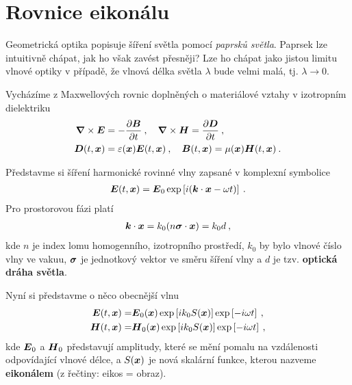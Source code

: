 \section{Rovnice eikonálu}

Geometrická optika popisuje šíření světla pomocí \textit{paprsků světla}. Paprsek lze intuitivně chápat, jak ho však zavést přesněji? Lze ho chápat jako jistou limitu vlnové optiky v případě, že vlnová délka světla $\lambda$ bude velmi malá, tj. $\lambda \rightarrow 0$.

Vycházíme z Maxwellových rovnic doplněných o materiálové vztahy v izotropním dielektriku \begin{align}
     \boldsymbol{\nabla} \times \boldsymbol{E} &= - \dfrac{\partial \boldsymbol{B}}{\partial t} \:, \quad \boldsymbol{\nabla} \times \boldsymbol{H} = \dfrac{\partial \boldsymbol{D}}{\partial t} \:, \\ \label{eq:Maxwell}
     \boldsymbol{D}(t, \boldsymbol{x}) &= \varepsilon(\boldsymbol{x}) \boldsymbol{E}(t, \boldsymbol{x}) \:, \quad \boldsymbol{B}(t, \boldsymbol{x}) = \mu(\boldsymbol{x}) \boldsymbol{H}(t, \boldsymbol{x}) \:.
\end{align}

Představme si šíření harmonické rovinné vlny zapsané v komplexní symbolice 
\begin{align}
    \boldsymbol{E}(t, \boldsymbol{x}) = \boldsymbol{E}_0 \exp \left[ i (\boldsymbol{k} \cdot \boldsymbol{x} - \omega t) \right] \:.
\end{align}
Pro prostorovou fázi platí \begin{align}
    \boldsymbol{k} \cdot \boldsymbol{x} = k_0 (n \boldsymbol{\sigma} \cdot \boldsymbol{x}) = k_0 d \:,
\end{align}
kde $n$ je index lomu homogenního, izotropního prostředí, $k_0$ by bylo vlnové číslo vlny ve vakuu, $\boldsymbol{\sigma}$ je jednotkový vektor ve směru šíření vlny a $d$ je tzv. \textbf{optická dráha světla}.

Nyní si představme o něco obecnější vlnu \begin{align}
    \boldsymbol{E}(t, \boldsymbol{x}) =& \boldsymbol{E}_0(\boldsymbol{x}) \exp \left[ i k_0 S(\boldsymbol{x}) \right] \exp \left[ - i \omega t \right] \:, \\ \label{eq:E}
    \boldsymbol{H}(t, \boldsymbol{x}) =& \boldsymbol{H}_0(\boldsymbol{x}) \exp \left[ i k_0 S(\boldsymbol{x}) \right] \exp \left[ - i \omega t \right] \:, \\ \label{eq:H}
\end{align}
kde $\boldsymbol{E}_0$ a $\boldsymbol{H}_0$ představují amplitudy, které se mění pomalu na vzdálenosti odpovídající vlnové délce, a $S(\boldsymbol{x})$ je nová skalární funkce, kterou nazveme \textbf{eikonálem} (z řečtiny: eikos = obraz).

